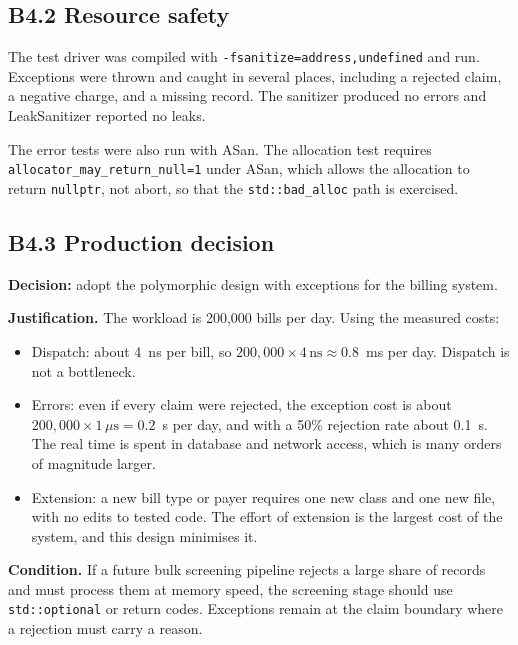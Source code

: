 \documentclass[11pt,a4paper]{article}
\newcommand{\lstout}[2]{}
\begin{document}
\subsection*{B4.2 Resource safety}
The test driver was compiled with \texttt{-fsanitize=address,undefined} and run. Exceptions were thrown and caught in several places, including a rejected claim, a negative charge, and a missing record. The sanitizer produced no errors and LeakSanitizer reported no leaks.

\lstout{../Task06_Extension_Final/billing_tests_asan.out}{Tail of the ASan and UBSan run: exception paths caught, scope guards destroyed, no sanitizer report}

\noindent The error tests were also run with ASan. The allocation test requires \texttt{allocator\_may\_return\_null=1} under ASan, which allows the allocation to return \texttt{nullptr}, not abort, so that the \texttt{std::bad\_alloc} path is exercised.

\lstout{../Task04_ErrorHandling/error_tests_asan.out}{Output of error\_tests under ASan (allocator\_may\_return\_null=1)}

\subsection*{B4.3 Production decision}
\textbf{Decision:} adopt the polymorphic design with exceptions for the billing system.

\noindent \textbf{Justification.} The workload is 200{,}000 bills per day. Using the measured costs:
\begin{itemize}[nosep]
\item Dispatch: about 4~ns per bill, so $200{,}000 \times 4\,\text{ns} \approx 0.8$~ms per day. Dispatch is not a bottleneck.
\item Errors: even if every claim were rejected, the exception cost is about $200{,}000 \times 1\,\mu\text{s} = 0.2$~s per day, and with a 50\% rejection rate about 0.1~s. The real time is spent in database and network access, which is many orders of magnitude larger.
\item Extension: a new bill type or payer requires one new class and one new file, with no edits to tested code. The effort of extension is the largest cost of the system, and this design minimises it.
\end{itemize}

\noindent \textbf{Condition.} If a future bulk screening pipeline rejects a large share of records and must process them at memory speed, the screening stage should use \texttt{std::optional} or return codes. Exceptions remain at the claim boundary where a rejection must carry a reason.
\end{document}
